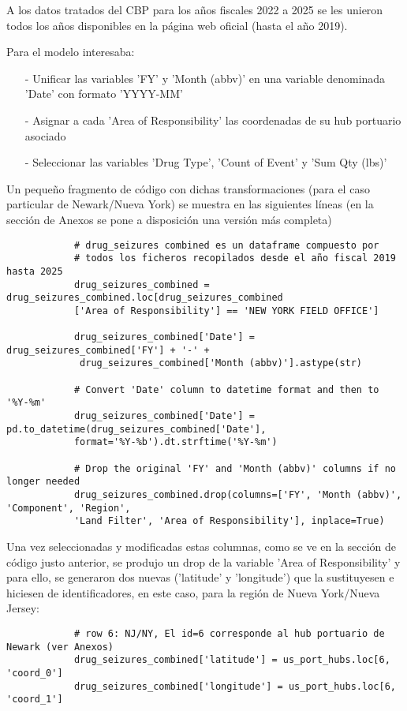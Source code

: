 \documentclass[12pt]{article}
\begin{document}
		A los datos tratados del CBP para los años fiscales 2022 a 2025 se les unieron todos los años disponibles en la página web oficial (hasta el año 2019).
		
		Para el modelo interesaba:
		\begin{itemize}
			\item [-] Unificar las variables 'FY' y 'Month (abbv)' en una variable denominada 'Date' con formato 'YYYY-MM'
			\item [-] Asignar a cada 'Area of Responsibility' las coordenadas de su hub portuario asociado
			\item [-] Seleccionar las variables 'Drug Type', 'Count of Event' y 'Sum Qty (lbs)'
		\end{itemize}
	
		Un pequeño fragmento de código con dichas transformaciones (para el caso particular de Newark/Nueva York) se muestra en las siguientes líneas (en la sección de Anexos se pone a disposición una versión más completa)
		
		\begin{verbatim}
			# drug_seizures combined es un dataframe compuesto por
			# todos los ficheros recopilados desde el año fiscal 2019 hasta 2025
			drug_seizures_combined = drug_seizures_combined.loc[drug_seizures_combined
			['Area of Responsibility'] == 'NEW YORK FIELD OFFICE']
			
			drug_seizures_combined['Date'] = drug_seizures_combined['FY'] + '-' +
			 drug_seizures_combined['Month (abbv)'].astype(str)
			 
			# Convert 'Date' column to datetime format and then to '%Y-%m'
			drug_seizures_combined['Date'] = pd.to_datetime(drug_seizures_combined['Date'],
			format='%Y-%b').dt.strftime('%Y-%m')
			
			# Drop the original 'FY' and 'Month (abbv)' columns if no longer needed
			drug_seizures_combined.drop(columns=['FY', 'Month (abbv)', 'Component', 'Region', 
			'Land Filter', 'Area of Responsibility'], inplace=True)
		\end{verbatim}
	
		
		Una vez seleccionadas y modificadas estas columnas, como se ve en la sección de código justo anterior, se produjo un drop de la variable 'Area of Responsibility' y para ello, se generaron dos nuevas ('latitude' y 'longitude') que la sustituyesen e hiciesen de identificadores, en este caso, para la región de Nueva York/Nueva Jersey:
		
		\begin{verbatim}
			# row 6: NJ/NY, El id=6 corresponde al hub portuario de Newark (ver Anexos)
			drug_seizures_combined['latitude'] = us_port_hubs.loc[6, 'coord_0']
			drug_seizures_combined['longitude'] = us_port_hubs.loc[6, 'coord_1']
		\end{verbatim}
	
\end{document}
